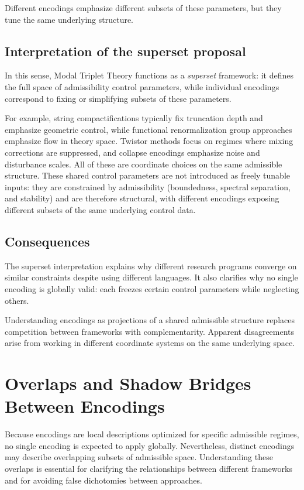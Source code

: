 \documentclass[11pt]{article}
\begin{document}
Different encodings emphasize different subsets of these parameters, but they tune the same underlying structure.

\subsection{Interpretation of the superset proposal}

In this sense, Modal Triplet Theory functions as a \emph{superset} framework: it defines the full space of admissibility control parameters, while individual encodings correspond to fixing or simplifying subsets of these parameters.

For example, string compactifications typically fix truncation depth and emphasize geometric control, while functional renormalization group approaches emphasize flow in theory space. Twistor methods focus on regimes where mixing corrections are suppressed, and collapse encodings emphasize noise and disturbance scales. All of these are coordinate choices on the same admissible structure.
These shared control parameters are not introduced as freely tunable inputs:
they are constrained by admissibility (boundedness, spectral separation, and stability) and are therefore structural,
with different encodings exposing different subsets of the same underlying control data.


\subsection{Consequences}

The superset interpretation explains why different research programs converge on similar constraints despite using different languages. It also clarifies why no single encoding is globally valid: each freezes certain control parameters while neglecting others.

Understanding encodings as projections of a shared admissible structure replaces competition between frameworks with complementarity. Apparent disagreements arise from working in different coordinate systems on the same underlying space.

\section{Overlaps and Shadow Bridges Between Encodings}

Because encodings are local descriptions optimized for specific admissible regimes, no single encoding is expected to apply globally. Nevertheless, distinct encodings may describe overlapping subsets of admissible space. Understanding these overlaps is essential for clarifying the relationships between different frameworks and for avoiding false dichotomies between approaches.
\end{document}
